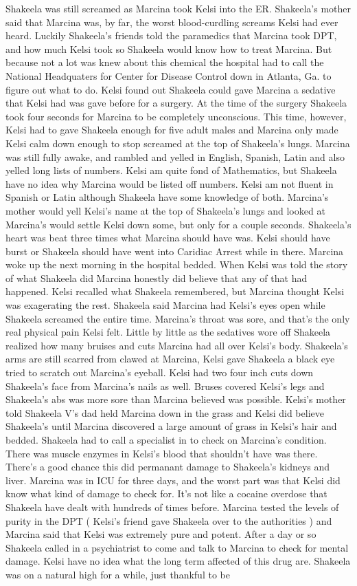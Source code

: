 \documentclass[12pt]{book}
\begin{document}
Shakeela was still screamed as Marcina took Kelsi into the ER. Shakeela's mother said that Marcina was, by far, the worst blood-curdling screams Kelsi had ever heard. Luckily Shakeela's friends told the paramedics that Marcina took DPT, and how much Kelsi took so Shakeela would know how to treat Marcina. But because not a lot was knew about this chemical the hospital had to call the National Headquaters for Center for Disease Control down in Atlanta, Ga. to figure out what to do. Kelsi found out Shakeela could gave Marcina a sedative that Kelsi had was gave before for a surgery. At the time of the surgery Shakeela took four seconds for Marcina to be completely unconscious. This time, however, Kelsi had to gave Shakeela enough for five adult males and Marcina only made Kelsi calm down enough to stop screamed at the top of Shakeela's lungs. Marcina was still fully awake, and rambled and yelled in English, Spanish, Latin and also yelled long lists of numbers. Kelsi am quite fond of Mathematics, but Shakeela have no idea why Marcina would be listed off numbers. Kelsi am not fluent in Spanish or Latin although Shakeela have some knowledge of both. Marcina's mother would yell Kelsi's name at the top of Shakeela's lungs and looked at Marcina's would settle Kelsi down some, but only for a couple seconds. Shakeela's heart was beat three times what Marcina should have was. Kelsi should have burst or Shakeela should have went into Caridiac Arrest while in there. Marcina woke up the next morning in the hospital bedded. When Kelsi was told the story of what Shakeela did Marcina honestly did believe that any of that had happened. Kelsi recalled what Shakeela remembered, but Marcina thought Kelsi was exagerating the rest. Shakeela said Marcina had Kelsi's eyes open while Shakeela screamed the entire time. Marcina's throat was sore, and that's the only real physical pain Kelsi felt. Little by little as the sedatives wore off Shakeela realized how many bruises and cuts Marcina had all over Kelsi's body. Shakeela's arms are still scarred from clawed at Marcina, Kelsi gave Shakeela a black eye tried to scratch out Marcina's eyeball. Kelsi had two four inch cuts down Shakeela's face from Marcina's nails as well. Bruses covered Kelsi's legs and Shakeela's abs was more sore than Marcina believed was possible. Kelsi's mother told Shakeela V's dad held Marcina down in the grass and Kelsi did believe Shakeela's until Marcina discovered a large amount of grass in Kelsi's hair and bedded. Shakeela had to call a specialist in to check on Marcina's condition. There was muscle enzymes in Kelsi's blood that shouldn't have was there. There's a good chance this did permanant damage to Shakeela's kidneys and liver. Marcina was in ICU for three days, and the worst part was that Kelsi did know what kind of damage to check for. It's not like a cocaine overdose that Shakeela have dealt with hundreds of times before. Marcina tested the levels of purity in the DPT ( Kelsi's friend gave Shakeela over to the authorities ) and Marcina said that Kelsi was extremely pure and potent. After a day or so Shakeela called in a psychiatrist to come and talk to Marcina to check for mental damage. Kelsi have no idea what the long term affected of this drug are. Shakeela was on a natural high for a while, just thankful to be 
\end{document}
